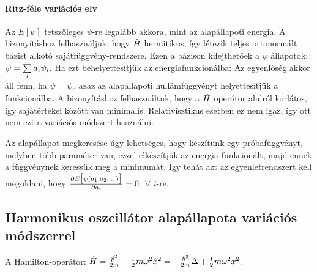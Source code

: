    \paragraph{Ritz-féle variációs elv}
    
    Az $E[\psi]$ tetszőleges $\psi$-re legalább akkora, mint az alapállapoti energia. A bizonyításhoz felhasználjuk, hogy $\hat{H}$ hermitikus, így létezik teljes ortonormált bázist alkotó sajátfüggvény-rendszere. Ezen a bázison kifejthetőek a $\psi$ állapotok: $\psi=\sum\limits_{i}^{}a_i\psi_i$. Ha ezt behelyettesítjük az energiafunkcionálba:
    Az egyenlőség akkor áll fenn, ha $\psi=\psi_0$ azaz az alapállapoti hullámfüggvényt helyettesítjük a funkcionálba. A bizonyításhoz felhasználtuk, hogy a $\hat{H}$ operátor alulról korlátos, így sajátértékei között van minimális. Relativisztikus esetben ez nem igaz, így ott nem ezt a variációs módszert használni. 
    
    Az alapállapot megkeresése úgy lehetséges, hogy készítünk egy próbafüggvényt, melyben több paraméter van, ezzel elkészítjük az energia funkcionált, majd ennek a függvénynek keressük meg a minimumát. Így tehát azt az egyenletrendszert kell megoldani, hogy $\frac{\partial E\big[\psi(a_1,a_2,\dots)\big]}{\partial a_i}=0$, $\forall$ $i$-re. 
    
  \subsection{Harmonikus oszcillátor alapállapota variációs módszerrel}
   
   A Hamilton-operátor: $\hat{H}=\frac{\hat{p}^2}{2m}+\frac{1}{2}m\omega^2\hat{x}^2=-\frac{\hbar^2}{2m}\Delta+\frac{1}{2}m\omega^2 x^2$.
   
